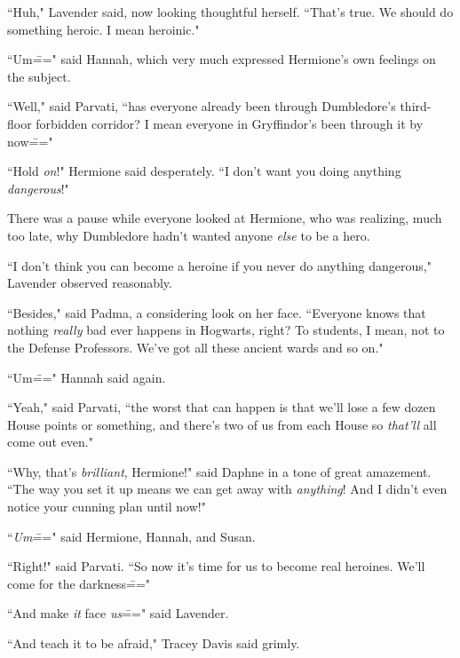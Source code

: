 ``Huh," Lavender said, now looking thoughtful herself. ``That's true. We should do something heroic. I mean heroinic."

``Um\===" said Hannah, which very much expressed Hermione's own feelings on the subject.

``Well," said Parvati, ``has everyone already been through Dumbledore's third-floor forbidden corridor? I mean everyone in Gryffindor's been through it by now\==="

``Hold \emph{on}!" Hermione said desperately. ``I don't want you doing anything \emph{dangerous}!"

There was a pause while everyone looked at Hermione, who was realizing, much too late, why Dumbledore hadn't wanted anyone \emph{else} to be a hero.

``I don't think you can become a heroine if you never do anything dangerous," Lavender observed reasonably.

``Besides," said Padma, a considering look on her face. ``Everyone knows that nothing \emph{really} bad ever happens in Hogwarts, right? To students, I mean, not to the Defense Professors. We've got all these ancient wards and so on."

``Um\===" Hannah said again.

``Yeah," said Parvati, ``the worst that can happen is that we'll lose a few dozen House points or something, and there's two of us from each House so \emph{that'll} all come out even."

``Why, that's \emph{brilliant}, Hermione!" said Daphne in a tone of great amazement. ``The way you set it up means we can get away with \emph{anything}! And I didn't even notice your cunning plan until now!"

``\emph{Um}\===" said Hermione, Hannah, and Susan.

``Right!" said Parvati. ``So now it's time for us to become real heroines. We'll come for the darkness\==="

``And make \emph{it} face \emph{us}\===" said Lavender.

``And teach it to be afraid," Tracey Davis said grimly.

